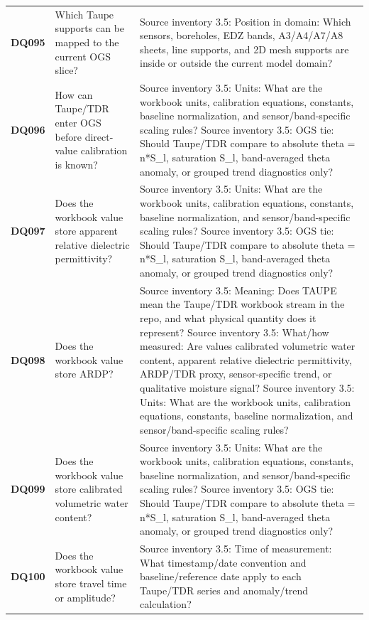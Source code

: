 \begin{longtable}{@{}L{0.09\textwidth} L{0.31\textwidth} L{0.52\textwidth}@{}}
\addlinespace[0.18em]
\textbf{DQ095} & Which Taupe supports can be mapped to the current OGS slice? & Source inventory 3.5: Position in domain: Which sensors, boreholes, EDZ bands, A3/A4/A7/A8 sheets, line supports, and 2D mesh supports are inside or outside the current model domain?\\
\addlinespace[0.18em]
\textbf{DQ096} & How can Taupe/TDR enter OGS before direct-value calibration is known? & Source inventory 3.5: Units: What are the workbook units, calibration equations, constants, baseline normalization, and sensor/band-specific scaling rules? Source inventory 3.5: OGS tie: Should Taupe/TDR compare to absolute theta = n*S\_l, saturation S\_l, band-averaged theta anomaly, or grouped trend diagnostics only?\\
\addlinespace[0.18em]
\textbf{DQ097} & Does the workbook value store apparent relative dielectric permittivity? & Source inventory 3.5: Units: What are the workbook units, calibration equations, constants, baseline normalization, and sensor/band-specific scaling rules? Source inventory 3.5: OGS tie: Should Taupe/TDR compare to absolute theta = n*S\_l, saturation S\_l, band-averaged theta anomaly, or grouped trend diagnostics only?\\
\addlinespace[0.18em]
\textbf{DQ098} & Does the workbook value store ARDP? & Source inventory 3.5: Meaning: Does TAUPE mean the Taupe/TDR workbook stream in the repo, and what physical quantity does it represent? Source inventory 3.5: What/how measured: Are values calibrated volumetric water content, apparent relative dielectric permittivity, ARDP/TDR proxy, sensor-specific trend, or qualitative moisture signal? Source inventory 3.5: Units: What are the workbook units, calibration equations, constants, baseline normalization, and sensor/band-specific scaling rules?\\
\addlinespace[0.18em]
\textbf{DQ099} & Does the workbook value store calibrated volumetric water content? & Source inventory 3.5: Units: What are the workbook units, calibration equations, constants, baseline normalization, and sensor/band-specific scaling rules? Source inventory 3.5: OGS tie: Should Taupe/TDR compare to absolute theta = n*S\_l, saturation S\_l, band-averaged theta anomaly, or grouped trend diagnostics only?\\
\addlinespace[0.18em]
\textbf{DQ100} & Does the workbook value store travel time or amplitude? & Source inventory 3.5: Time of measurement: What timestamp/date convention and baseline/reference date apply to each Taupe/TDR series and anomaly/trend calculation?\\

\end{longtable}
